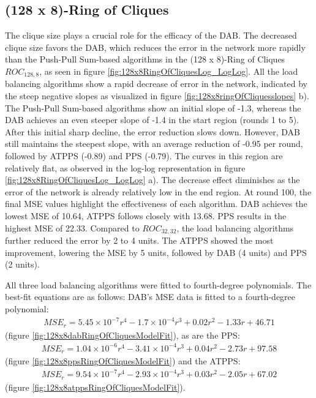 \subsection{(128 x 8)-Ring of Cliques}\label{subsec:128_8ROC}
The clique size plays a crucial role for the efficacy of the DAB. The decreased clique size favors the DAB, which reduces the error in the network more rapidly than the Push-Pull Sum-based algorithms in the (128 x 8)-Ring of Cliques $ROC_{128,8}$, as seen in figure \ref{fig:128x8RingOfCliquesLog_LogLog}. All the load balancing algorithms show a rapid decrease of error in the network, indicated by the steep negative slopes as visualized in figure \ref{fig:128x8ringOfCliquesslopes} b). The Push-Pull Sum-based algorithms show an initial slope of -1.3, whereas the DAB achieves an even steeper slope of -1.4 in the start region (rounds 1 to 5). After this initial sharp decline, the error reduction slows down. However, DAB still maintains the steepest slope, with an average reduction of -0.95 per round, followed by ATPPS (-0.89) and PPS (-0.79). The curves in this region are relatively flat, as observed in the log-log representation in figure \ref{fig:128x8RingOfCliquesLog_LogLog} a). The decrease effect diminishes as the error of the network is already relatively low in the end region. At round 100, the final MSE values highlight the effectiveness of each algorithm. DAB achieves the lowest MSE of 10.64, ATPPS follows closely with 13.68. PPS results in the highest MSE of 22.33. Compared to $ROC_{32,32}$, the load balancing algorithms further reduced the error by 2 to 4 units. The ATPPS showed the most improvement, lowering the MSE by 5 units, followed by DAB (4 units) and PPS (2 units).

All three load balancing algorithms were fitted to fourth-degree polynomials. The best-fit equations are as follows: DAB's MSE data is fitted to a fourth-degree polynomial:
\begin{align}
    MSE_r=5.45\times 10 ^{-7}r^{4}-1.7\times 10^{-4}r^{3}+0.02r^{2}-1.33r+46.71    
\end{align}
(figure \ref{fig:128x8dabRingOfCliquesModelFit}), as are the PPS:
\begin{align}
    MSE_r=1.04\times 10 ^{-6}r^{4}-3.41\times 10^{-4}r^{3}+0.04r^{2}-2.73r+97.58    
\end{align}
(figure \ref{fig:128x8ppsRingOfCliquesModelFit}) and the ATPPS:
\begin{align}
    MSE_r=9.54\times 10^{-7}r^{4}-2.93\times 10^{-4}r^{3}+0.03r^{2}-2.05r+67.02    
\end{align}
(figure \ref{fig:128x8atppsRingOfCliquesModelFit}).

